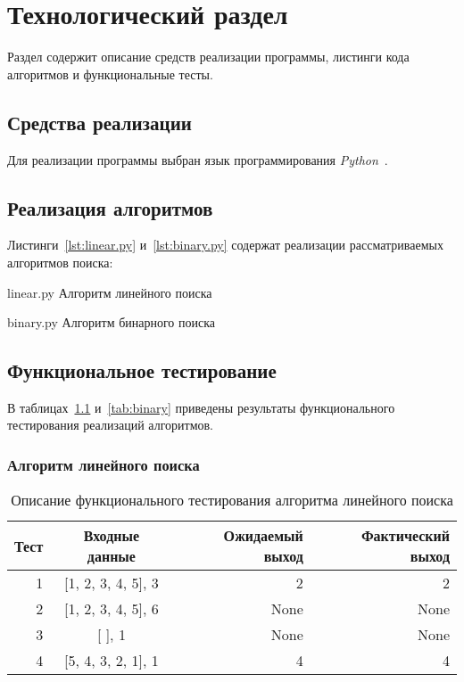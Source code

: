 \chapter{Технологический раздел}

Раздел содержит описание средств реализации программы, листинги кода алгоритмов и функциональные тесты.

\section{Средства реализации}

Для реализации программы выбран язык программирования \textit{Python}~\cite{pydoc}.

\section{Реализация алгоритмов}

Листинги~\ref{lst:linear.py} и~\ref{lst:binary.py} содержат реализации рассматриваемых алгоритмов поиска:

{linear.py} %
{Алгоритм линейного поиска} %

\clearpage

{binary.py} %
{Алгоритм бинарного поиска} %

\clearpage

\section{Функциональное тестирование}

В таблицах~\ref{tab:linear} и~\ref{tab:binary} приведены результаты функционального тестирования реализаций алгоритмов.

\subsection{Алгоритм линейного поиска}

\begin{table}[h!]
    \centering
    \caption{Описание функционального тестирования алгоритма линейного поиска}
    \begin{tabular}{|r|c|r|r|}
        \hline
        \textbf{Тест} & \textbf{Входные данные} & \textbf{Ожидаемый выход} & \textbf{Фактический выход} \\
        \hline
        1 & [1, 2, 3, 4, 5], 3 & 2 & 2 \\
        \hline
        2 & [1, 2, 3, 4, 5], 6 & None & None \\
        \hline
        3 & [ ], 1 & None & None \\
        \hline
        4 & [5, 4, 3, 2, 1], 1 & 4 & 4 \\
        \hline
    \end{tabular}
    \label{tab:linear}
\end{table}

